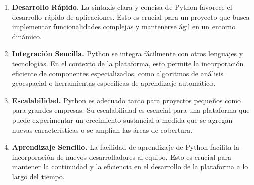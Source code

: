 \documentclass{article}
\begin{document}
\begin{itemize}
\begin{enumerate}
                    \item \textbf{Desarrollo Rápido.} La sintaxis clara y concisa de Python favorece el desarrollo rápido de aplicaciones. Esto es crucial para un proyecto que busca implementar funcionalidades complejas y mantenerse ágil en un entorno dinámico.

                    \item \textbf{Integración Sencilla.} Python se integra fácilmente con otros lenguajes y tecnologías. En el contexto de la plataforma, esto permite la incorporación eficiente de componentes especializados, como algoritmos de análisis geoespacial o herramientas específicas de aprendizaje automático.

                    \item \textbf{Escalabilidad.} Python es adecuado tanto para proyectos pequeños como para grandes empresas. Su escalabilidad es esencial para una plataforma que puede experimentar un crecimiento sustancial a medida que se agregan nuevas características o se amplían las áreas de cobertura.

                    \item \textbf{Aprendizaje Sencillo.} La facilidad de aprendizaje de Python facilita la incorporación de nuevos desarrolladores al equipo. Esto es crucial para mantener la continuidad y la eficiencia en el desarrollo de la plataforma a lo largo del tiempo.
                \end{enumerate}
        \end{itemize}
\end{document}
